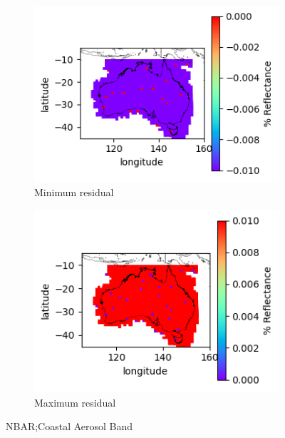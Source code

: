 \documentclass[a4paper]{article}
\begin{document}
      \begin{figure}[h!]
        \centering
          \begin{subfigure}[l]{.4\linewidth}
            \hspace{-32mm}
            \includegraphics[scale=0.9]{plots/nbar/nbar_coastal_aerosol-MinResidual.png}
            \caption{Minimum residual}
          \end{subfigure}
%
          \begin{subfigure}[r]{.4\linewidth}
            \includegraphics[scale=0.9]{plots/nbar/nbar_coastal_aerosol-MaxResidual.png}
            \caption{Maximum residual}
          \end{subfigure}
        \caption{NBAR;\@ Coastal Aerosol Band}\label{figure:2}
      \end{figure}

  \clearpage
\end{document}
